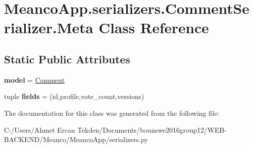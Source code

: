 \hypertarget{class_meanco_app_1_1serializers_1_1_comment_serializer_1_1_meta}{}\section{Meanco\+App.\+serializers.\+Comment\+Serializer.\+Meta Class Reference}
\label{class_meanco_app_1_1serializers_1_1_comment_serializer_1_1_meta}
\subsection*{Static Public Attributes}
\begin{DoxyCompactItemize}
\item 
\hypertarget{class_meanco_app_1_1serializers_1_1_comment_serializer_1_1_meta_a2af806a7c3692472d49c7857870464a5}{}\label{class_meanco_app_1_1serializers_1_1_comment_serializer_1_1_meta_a2af806a7c3692472d49c7857870464a5} 
{\bfseries model} = \hyperlink{class_meanco_app_1_1models_1_1comment_1_1_comment}{Comment}
\item 
\hypertarget{class_meanco_app_1_1serializers_1_1_comment_serializer_1_1_meta_a6f5bdf257b78d56c0ce8ddb11c60292b}{}\label{class_meanco_app_1_1serializers_1_1_comment_serializer_1_1_meta_a6f5bdf257b78d56c0ce8ddb11c60292b} 
tuple {\bfseries fields} = (\textquotesingle{}id\textquotesingle{},\textquotesingle{}profile\textquotesingle{},\textquotesingle{}vote\+\_\+count\textquotesingle{},\textquotesingle{}versions\textquotesingle{})
\end{DoxyCompactItemize}


The documentation for this class was generated from the following file\+:\begin{DoxyCompactItemize}
\item 
C\+:/\+Users/\+Ahmet Ercan Tekden/\+Documents/bounswe2016group12/\+W\+E\+B-\/\+B\+A\+C\+K\+E\+N\+D/\+Meanco/\+Meanco\+App/serializers.\+py\end{DoxyCompactItemize}
